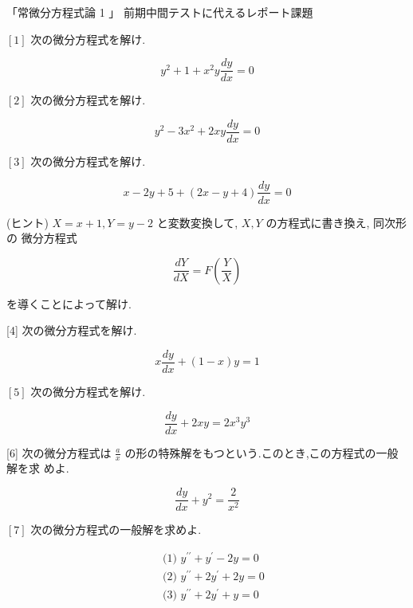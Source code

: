 \documentclass[10pt]{article}
\begin{document}
「常微分方程式論 1 」 前期中間テストに代えるレポート課題

$[1]$ 次の微分方程式を解け.


\begin{equation*}
y^{2}+1+x^{2} y \frac{d y}{d x}=0 \tag{1}
\end{equation*}


$[2]$ 次の微分方程式を解け.


\begin{equation*}
y^{2}-3 x^{2}+2 x y \frac{d y}{d x}=0 \tag{2}
\end{equation*}


$[3]$ 次の微分方程式を解け.


\begin{equation*}
x-2 y+5+(2 x-y+4) \frac{d y}{d x}=0 \tag{3}
\end{equation*}


(ヒント) $X=x+1, Y=y-2$ と変数変換して, $X, Y$ の方程式に書き換え, 同次形の 微分方程式


\begin{equation*}
\frac{d Y}{d X}=F\left(\frac{Y}{X}\right) \tag{4}
\end{equation*}


を導くことによって解け.

[4] 次の微分方程式を解け.


\begin{equation*}
x \frac{d y}{d x}+(1-x) y=1 \tag{5}
\end{equation*}


$[5]$ 次の微分方程式を解け.


\begin{equation*}
\frac{d y}{d x}+2 x y=2 x^{3} y^{3} \tag{6}
\end{equation*}


[6] 次の微分方程式は $\frac{a}{x}$ の形の特殊解をもつという.このとき,この方程式の一般解を求 めよ.


\begin{equation*}
\frac{d y}{d x}+y^{2}=\frac{2}{x^{2}} \tag{7}
\end{equation*}


$[7]$ 次の微分方程式の一般解を求めよ.


\begin{align*}
& \text { (1) } y^{\prime \prime}+y^{\prime}-2 y=0  \tag{8}\\
& \text { (2) } y^{\prime \prime}+2 y^{\prime}+2 y=0  \tag{9}\\
& \text { (3) } y^{\prime \prime}+2 y^{\prime}+y=0 \tag{10}
\end{align*}
\end{document}
